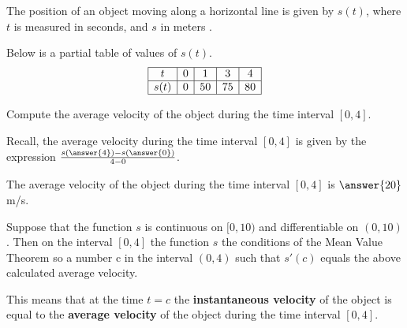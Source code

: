 \documentclass{ximera}
\author{Nela Lakos \and Kyle Parsons}
\begin{document}
The position of an object moving along a horizontal line is given by $s(t)$, where $t$ is measured in seconds, and $s$ in meters .

Below is a partial table of values of $s(t)$.
\[
\begin{array}{|c|c|c|c|c|}
\hline
t & 0 & 1 & 3 & 4\\\hline
s(t) & 0 & 50 & 75 & 80\\\hline
\end{array} 
\]
\begin{exercise}
Compute the average velocity of the object during the time interval $[0,4]$.
\begin{hint}
Recall, the average velocity during the time interval $[0,4]$ is given by the expression $\frac{s(\answer{4})-s(\answer{0})}{4-0}$.
\end{hint}
The average velocity of the object during the time interval $[0,4]$ is $\answer{20}$ m/s.
\end{exercise}
\begin{exercise}
Suppose that the function $s$ is continuous on $[0,10)$ and differentiable on $(0,10)$. Then  on the interval $[0,4]$ the function $s$  the conditions of the Mean Value Theorem so  a number c in the interval $(0,4)$ such that $s'(c)$ equals the above calculated average velocity.

This means that at the time $t=c$ the \textbf{instantaneous velocity} of the object is equal to the \textbf{average velocity} of the object during the time interval $[0,4]$.
\end{exercise}
\end{document}
